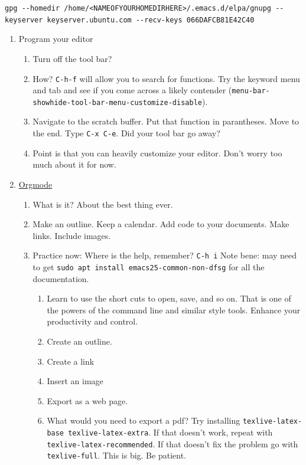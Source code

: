 \documentclass{article}
\begin{document}
\begin{enumerate}
\begin{enumerate}
\texttt{gpg -{}-homedir /home/<NAMEOFYOURHOMEDIRHERE>/.emacs.d/elpa/gnupg  -{}-keyserver keyserver.ubuntu.com -{}-recv-keys 066DAFCB81E42C40}
\end{enumerate}


\begin{enumerate}
\item Program your editor
\begin{enumerate}
\item Turn off the tool bar?
\item How? \texttt{C-h-f} will allow you to search for functions. Try the keyword menu and tab and see if you come across a likely contender (\texttt{menu-bar-showhide-tool-bar-menu-customize-disable}).
\item Navigate to the scratch buffer. Put that function in parantheses. Move to the end. Type \texttt{C-x C-e}. Did your tool bar go away?
\item Point is that you can heavily customize your editor. Don't worry too much about it for now.
\end{enumerate}
\item \href{org\#Top}{Orgmode}
\begin{enumerate}
\item What is it? About the best thing ever.
\item Make an outline. Keep a calendar. Add code to your documents. Make links. Include images.
\item Practice now:
Where is the help, remember? \texttt{C-h i}
Note bene: may need to get \texttt{sudo apt install emacs25-common-non-dfsg} for all the documentation. 
\begin{enumerate}
\item Learn to use the short cuts to open, save, and so on. That is one of the powers of the command line and similar style tools. Enhance your productivity and control.
\item Create an outline.
\item Create a link
\item Insert an image
\item Export as a web page.
\item What would you need to export a pdf?
Try installing \texttt{texlive-latex-base texlive-latex-extra}. If that doesn't work, repeat with \texttt{texlive-latex-recommended}. If that doesn't fix the problem go with \texttt{texlive-full}. This is big. Be patient.
\end{enumerate}
\end{enumerate}
\end{enumerate}
\end{enumerate}
\end{document}

